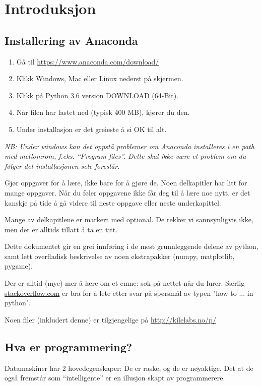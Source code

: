 \chapter{Introduksjon}
\section{Installering av Anaconda}
\begin{enumerate}
\item Gå til \url{https://www.anaconda.com/download/}
\item Klikk Windows, Mac eller Linux nederst på skjermen.
\item Klikk på Python 3.6 version  DOWNLOAD  (64-Bit).
\item Når filen har lastet ned (typisk 400 MB), kjører du den.
\item Under installasjon er det greieste å si OK til alt.
\end{enumerate}
{\em NB: Under windows kan det oppstå problemer om Anaconda installeres i en path med mellomrom, f.eks. \emph{``Program files''}. Dette skal ikke være et problem om du følger det installasjonen selv foreslår.}

Gjør oppgaver for å lære, ikke bare for å gjøre de. Noen delkapitler har litt for mange oppgaver. Når du føler oppgavene ikke får deg til å lære noe nytt, er det kanskje på tide å gå videre til neste oppgave eller neste underkapittel. 

Mange av delkapitlene er markert med optional. De rekker vi sannsynligvis ikke, men det er alltids tillatt å ta en titt. 

Dette dokumentet gir en grei innføring i de mest grunnleggende delene av python,  samt lett overfladisk beskrivelse av noen ekstrapakker (numpy, matplotlib, pygame). 

Der er alltid (mye) mer å lære om et emne: søk på nettet når du lurer. Særlig \url{stackoverflow.com} er bra for å lete etter svar på spørsmål av typen "how to ... in python". 

Noen filer (inkludert denne) er tilgjengelige på \url{http://kilelabs.no/p/}

\section{Hva er programmering?}
Datamaskiner har 2 hovedegenskaper: De er raske, og de er nøyaktige. Det at de også fremstår som ``intelligente'' er en illusjon skapt av programmerere.

